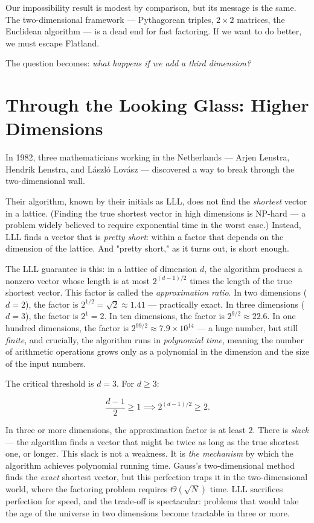 \documentclass[11pt,twoside,openright]{book}
\theoremstyle{definition}
\theoremstyle{remark}
\begin{document}
Our impossibility result is modest by comparison, but its message is the same. The two-dimensional framework --- Pythagorean triples, $2 \times 2$ matrices, the Euclidean algorithm --- is a dead end for fast factoring. If we want to do better, we must escape Flatland.

The question becomes: \textit{what happens if we add a third dimension?}


\section{Through the Looking Glass: Higher Dimensions}

In 1982, three mathematicians working in the Netherlands --- Arjen Lenstra, Hendrik Lenstra, and László Lovász --- discovered a way to break through the two-dimensional wall.

Their algorithm, known by their initials as LLL, does not find the \textit{shortest} vector in a lattice. (Finding the true shortest vector in high dimensions is NP-hard --- a problem widely believed to require exponential time in the worst case.) Instead, LLL finds a vector that is \textit{pretty short}: within a factor that depends on the dimension of the lattice. And "pretty short," as it turns out, is short enough.

The LLL guarantee is this: in a lattice of dimension $d$, the algorithm produces a nonzero vector whose length is at most $2^{(d-1)/2}$ times the length of the true shortest vector. This factor is called the \textit{approximation ratio}. In two dimensions ($d = 2$), the factor is $2^{1/2} = \sqrt{2} \approx 1.41$ --- practically exact. In three dimensions ($d = 3$), the factor is $2^1 = 2$. In ten dimensions, the factor is $2^{9/2} \approx 22.6$. In one hundred dimensions, the factor is $2^{99/2} \approx 7.9 \times 10^{14}$ --- a huge number, but still \textit{finite}, and crucially, the algorithm runs in \textit{polynomial time}, meaning the number of arithmetic operations grows only as a polynomial in the dimension and the size of the input numbers.

The critical threshold is $d = 3$. For $d \ge 3$:

\[\frac{d-1}{2} \ge 1 \implies 2^{(d-1)/2} \ge 2.\]

In three or more dimensions, the approximation factor is at least $2$. There is \textit{slack} --- the algorithm finds a vector that might be twice as long as the true shortest one, or longer. This slack is not a weakness. It is \textit{the mechanism} by which the algorithm achieves polynomial running time. Gauss's two-dimensional method finds the \textit{exact} shortest vector, but this perfection traps it in the two-dimensional world, where the factoring problem requires $\Theta(\sqrt{N})$ time. LLL sacrifices perfection for speed, and the trade-off is spectacular: problems that would take the age of the universe in two dimensions become tractable in three or more.
\end{document}
